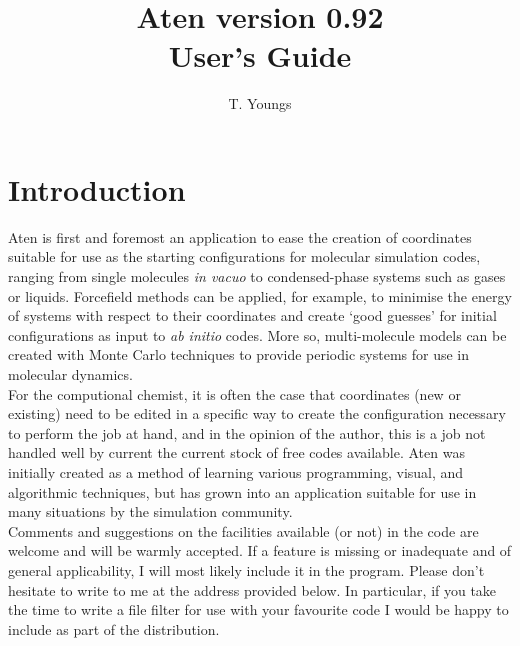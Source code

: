 \documentclass[a4paper,10pt]{report}
\begin{document}
\newenvironment{optlist}[1]
  {
    \begin{flushleft}\textbf{#1}\end{flushleft}
    \begin{list}{}{}
  }
  { \end{list} }

\newcommand{\progname}{{\sffamily Aten}}
\newcommand{\qte}[1]{\lq{}#1\rq{}}
\newcommand{\ttqte}[1]{\lq{}{\ttfamily#1}\rq{}}
\newcommand{\dqte}[1]{``#1''}
\newcommand{\its}{\hspace{20cm}}

\title{\progname{} version 0.92 \\ User's Guide}
\author{T. Youngs}
\maketitle

\tableofcontents

\clearpage

\section{Introduction}

\progname{} is first and foremost an application to ease the creation of coordinates suitable for use as the starting configurations for molecular simulation codes, ranging from single molecules \textit{in vacuo} to condensed-phase systems such as gases or liquids. Forcefield methods can be applied, for example, to minimise the energy of systems with respect to their coordinates and create \qte{good guesses} for initial configurations as input to \textit{ab initio} codes. More so, multi-molecule models can be created with Monte Carlo techniques to provide periodic systems for use in molecular dynamics.\\

For the computional chemist, it is often the case that coordinates (new or existing) need to be edited in a specific way to create the configuration necessary to perform the job at hand, and in the opinion of the author, this is a job not handled well by current the current stock of free codes available. \progname{} was initially created as a method of learning various programming, visual, and algorithmic techniques, but has grown into an application suitable for use in many situations by the simulation community.\\

Comments and suggestions on the facilities available (or not) in the code are welcome and will be warmly accepted. If a feature is missing or inadequate and of general applicability, I will most likely include it in the program. Please don't hesitate to write to me at the address provided below. In particular, if you take the time to write a file filter for use with your favourite code I would be happy to include as part of the distribution.\\
\end{document}
